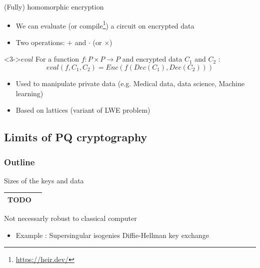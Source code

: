 \documentclass{beamer}
\begin{document}
\begin{frame}{(Fully) homomorphic encryption}
	\begin{itemize}
		\item We can evaluate (or compile\footnote{\url{https://heir.dev/}}) a circuit on encrypted data
		\item<2-> Two operations: $+$ and $\cdot$ (or $\times$)
	\end{itemize}
	\begin{block}<3->{$eval$}
		For a function $f : P \times P \rightarrow P$ and encrypted data $C_1$ and $C_2$ :
		\[eval(f, C_1, C_2) = Enc(f(Dec(C_1), Dec(C_2)))\]
	\end{block}
	\begin{itemize}
		\item<4-> Used to manipulate private data (e.g. Medical data, data science, Machine learning)
		\item<5-> Based on lattices (variant of LWE problem)
	\end{itemize}
\end{frame}

\subsection{Limits of PQ cryptography}
\begin{frame}
  \frametitle{Outline}
\end{frame}
\begin{frame}{Sizes of the keys and data}
	\begin{tabular}{|c|c|}
		\hline
		TODO & \\
		\hline
	\end{tabular}
\end{frame}

\begin{frame}{Not necessarly robust to classical computer}
	\begin{itemize}
		\item Example : Supersingular isogenies Diffie-Hellman key exchange
	\end{itemize}
\end{frame}
\end{document}

